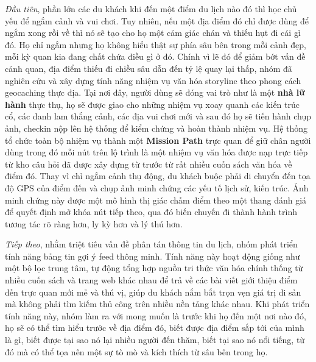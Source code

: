 \textit{Đầu tiên}, phần lớn các du khách khi đến một điểm du lịch nào đó thì học chủ yếu để ngắm cảnh 
và vui chơi. Tuy nhiên, nếu một địa điểm đó chỉ được dùng để ngắm xong rồi về thì nó sẽ tạo cho họ
một cảm giác chán và thiếu hụt đi cái gì đó. Họ chỉ ngắm nhưng họ không hiểu thật sự phía sâu bên trong mỗi
cảnh đẹp, mỗi kỳ quan kia đang chất chứa điều gì ở đó. Chính vì lẽ đó để giảm bớt vấn đề cảnh quan, địa điểm thiếu đi chiều sâu dẫn
đến tỷ lệ quay lại thấp, nhóm đã nghiên cứu và xây dựng tính năng nhiệm vụ văn hóa
storyline theo phong cách geocaching thực địa. Tại nơi đây, người dùng sẽ đóng vai trò như là một \textbf{nhà lữ hành}
thực thụ, họ sẽ được giao cho những nhiệm vụ xoay quanh các kiến trúc cổ, các danh lam thắng cảnh, các địa vui chơi mới và sau đó
họ sẽ tiến hành chụp ảnh, checkin nộp lên hệ thống để kiểm chứng và hoàn thành nhiệm vụ. Hệ thống tổ chức toàn bộ
nhiệm vụ thành một \textbf{Mission Path} trực quan để giữ chân người dùng
trong đó mỗi nút trên lộ trình là một nhiệm vụ văn hóa được
nạp trực tiếp từ kho câu hỏi đã được xây dựng từ trước từ rất nhiều cuốn sách văn hóa về điểm đó. Thay
vì chỉ ngắm cảnh thụ động, du khách buộc phải di chuyển đến tọa độ GPS
của điểm đến và chụp ảnh minh chứng các yếu tố lịch sử, kiến trúc. Ảnh
minh chứng này được một mô hình thị giác chấm
điểm theo một thang đánh giá để quyết định mở khóa nút tiếp
theo, qua đó biến chuyến đi thành hành trình tương tác rõ ràng hơn, ly kỳ hơn và lý thú hơn.

\textit{Tiếp theo}, nhằm triệt tiêu vấn đề phân tán thông tin du lịch, nhóm phát
triển tính năng bảng tin gợi ý feed thông minh. Tính năng này hoạt động
giống như một bộ lọc trung tâm, tự động tổng hợp nguồn tri thức văn
hóa chính thống từ nhiều cuốn sách và trang web khác nhau để trả về các bài viết giới thiệu điểm đến trực quan 
mới mẻ và thú vị, giúp du khách nắm bắt trọn vẹn giá trị di sản mà không phải tìm
kiếm thủ công trên nhiều nền tảng khác nhau. Khi phát triển tính năng này, nhóm làm ra với mong muốn là trước khi họ đến
một nơi nào đó, họ sẽ có thể tìm hiểu trước về địa điểm đó, biết được địa điểm sắp tới của mình là gì, biết được tại sao nó lại nhiều
người đến thăm, biết tại sao nó nổi tiếng, từ đó mà có thể tọa nên một sự tò mò và kích thích từ sâu bên trong họ.

